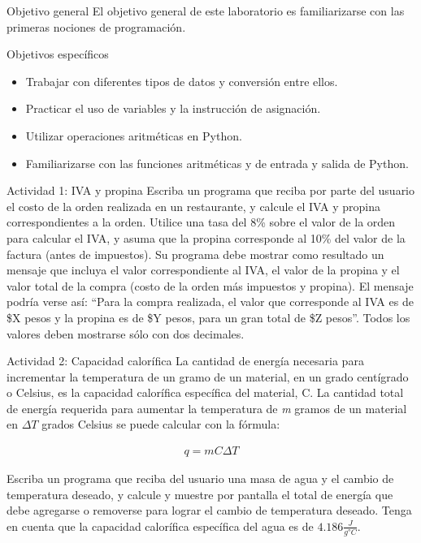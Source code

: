 \documentclass{isis-lab}
\begin{document}
\maketitle

\begin{sectionbox}{Objetivo general}
El objetivo general de este laboratorio es familiarizarse con las primeras nociones de programación.
\end{sectionbox}

\begin{sectionbox}{Objetivos específicos}
\begin{itemize}
    \item Trabajar con diferentes tipos de datos y conversión entre ellos.
    \item Practicar el uso de variables y la instrucción de asignación.
    \item Utilizar operaciones aritméticas en Python.
    \item Familiarizarse con las funciones aritméticas y de entrada y salida de Python.
\end{itemize}
\end{sectionbox}

\begin{sectionbox}{Actividad 1: IVA y propina}
Escriba un programa que reciba por parte del usuario el costo de la orden realizada en un restaurante, y calcule el IVA y propina correspondientes a la orden. Utilice una tasa del 8\% sobre el valor de la orden para calcular el IVA, y asuma que la propina corresponde al 10\% del valor de la factura (antes de impuestos). Su programa debe mostrar como resultado un mensaje que incluya el valor correspondiente al IVA, el valor de la propina y el valor total de la compra (costo de la orden más impuestos y propina). El mensaje podría verse así: ``Para la compra realizada, el valor que corresponde al IVA es de \$X pesos y la propina es de \$Y pesos, para un gran total de \$Z pesos''. Todos los valores deben mostrarse sólo con dos decimales.
\end{sectionbox}

\begin{sectionbox}{Actividad 2: Capacidad calorífica}
La cantidad de energía necesaria para incrementar la temperatura de un gramo de un material, en un grado centígrado o Celsius, es la capacidad calorífica específica del material, C. La cantidad total de energía requerida para aumentar la temperatura de \textit{m} gramos de un material en $\Delta T$ grados Celsius se puede calcular con la fórmula:

\begin{gather*}
    q = mC\Delta T
\end{gather*}

Escriba un programa que reciba del usuario una masa de agua y el cambio de temperatura deseado, y calcule y muestre por pantalla el total de energía que debe agregarse o removerse para lograr el cambio de temperatura deseado. Tenga en cuenta que la capacidad calorífica específica del agua es de $4.186 \frac{J}{g°C}$.
\end{sectionbox}
\end{document}
